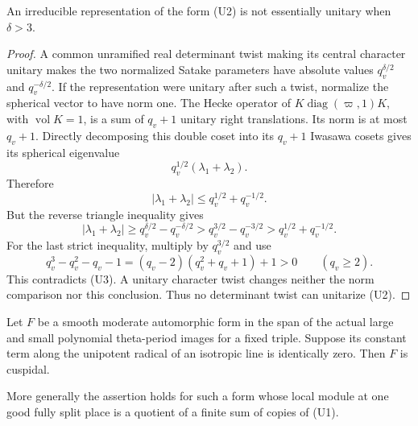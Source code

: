 \begin{srlemma}
\label{lem:sr-cusp-line-unitarity}
An irreducible representation of the form (U2) is not essentially
unitary when \(\delta>3\).
\end{srlemma}

\begin{proof}
A common unramified real determinant twist making its central
character unitary makes the two normalized Satake parameters
have absolute values \(q_v^{\delta/2}\) and
\(q_v^{-\delta/2}\).
If the representation were unitary after such a twist, normalize
the spherical vector to have norm one.
The Hecke operator of
\(K\operatorname{diag}(\varpi,1)K\), with \(\operatorname{vol}K=1\),
is a sum of \(q_v+1\) unitary right translations.
Its norm is at most \(q_v+1\).
Directly decomposing this double coset into its \(q_v+1\)
Iwasawa cosets gives its spherical eigenvalue
\[
                 q_v^{1/2}(\lambda_1+\lambda_2).
\]
Therefore
\[
 |\lambda_1+\lambda_2|
          \le q_v^{1/2}+q_v^{-1/2}.                 \tag{U3}
 \label{eq:sr-cusp-line-unitary-Hecke}
\]
But the reverse triangle inequality gives
\[
 |\lambda_1+\lambda_2|
       \ge q_v^{\delta/2}-q_v^{-\delta/2}
       > q_v^{3/2}-q_v^{-3/2}
       >q_v^{1/2}+q_v^{-1/2}.
\]
For the last strict inequality, multiply by \(q_v^{3/2}\)
and use
\[
 q_v^3-q_v^2-q_v-1
       =(q_v-2)(q_v^2+q_v+1)+1>0
       \qquad(q_v\ge2).
\]
This contradicts (U3).
A unitary character twist changes neither the norm comparison
nor this conclusion. Thus no determinant twist can unitarize
(U2).
\end{proof}

\begin{srproposition}
\label{prop:sr-theta-line-implies-cusp}
Let \(F\) be a smooth moderate automorphic form in the span of
the actual large and small polynomial theta-period images
for a fixed triple. Suppose its constant term along the
unipotent radical of an isotropic line is identically zero.
Then \(F\) is cuspidal.

More generally the assertion holds for such a form whose local
module at one good fully split place is a quotient of a finite
sum of copies of (U1).
\end{srproposition}

